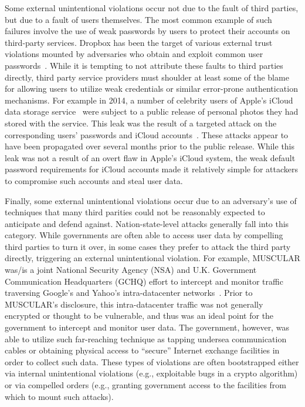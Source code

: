 Some external unintentional violations occur not due to the fault of
third parties, but due to a fault of users themselves. The most common
example of such failures involve the use of weak passwords by users to
protect their accounts on third-party services.  Dropbox has been the
target of various external trust violations mounted by adversaries who
obtain and exploit common user
passwords~\cite{dropbox-passwords}. While it is tempting to not
attribute these faults to third parties directly, third party service
providers must shoulder at least some of the blame for allowing users
to utilize weak credentials or similar error-prone authentication
mechanisms. For example in 2014, a number of celebrity users of
Apple's iCloud data storage service~\cite{apple-icloud} were subject
to a public release of personal photos they had stored with the
service. This leak was the result of a targeted attack on the
corresponding users' passwords and iCloud
accounts~\cite{apple-icloudleak}. These attacks appear to have been
propagated over several months prior to the public release. While this
leak was not a result of an overt flaw in Apple's iCloud system, the
weak default password requirements for iCloud accounts made it
relatively simple for attackers to compromise such accounts and steal
user data.

Finally, some external unintentional violations occur due to an
adversary's use of techniques that many third parities could not be
reasonably expected to anticipate and defend
against. Nation-state-level attacks generally fall into this
category. While governments are often able to access user data by
compelling third parties to turn it over, in some cases they prefer to
attack the third party directly, triggering an external unintentional
violation. For example, MUSCULAR was/is a joint National Security
Agency (NSA) and U.K. Government Communication Headquarters (GCHQ)
effort to intercept and monitor traffic traversing Google's and
Yahoo's intra-datacenter networks~\cite{gellman-muscular}. Prior to
MUSCULAR's disclosure, this intra-datacenter traffic was not generally
encrypted or thought to be vulnerable, and thus was an ideal point for
the government to intercept and monitor user data. The government,
however, was able to utilize such far-reaching technique as tapping
undersea communication cables or obtaining physical access to
``secure'' Internet exchange facilities in order to collect such
data. These types of violations are often bootstrapped either via
internal unintentional violations (e.g., exploitable bugs in a crypto
algorithm) or via compelled orders (e.g., granting government access
to the facilities from which to mount such attacks).

